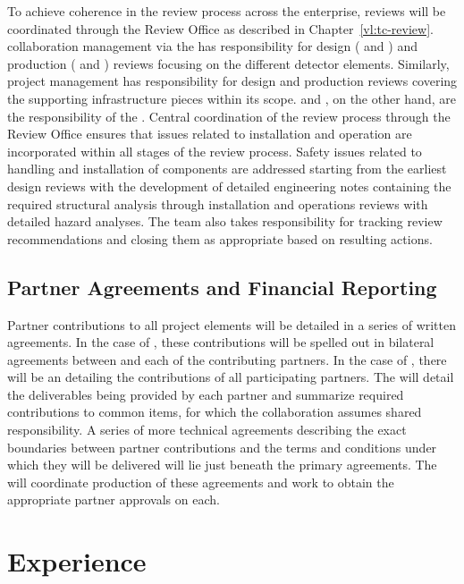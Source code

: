 To achieve coherence in the review process across the
 enterprise, reviews will be coordinated through the
 Review Office as described in Chapter~\ref{vl:tc-review}.
 collaboration management via the  has
responsibility for design ( and ) and production
( and ) reviews focusing on the different
detector elements.  Similarly,  project management has
responsibility for design and production reviews covering the
supporting infrastructure pieces within its scope.   and
, on the other hand, are the responsibility of the
.  Central coordination of the review process through the
 Review Office ensures that issues related to installation
and operation are incorporated within all stages of the review
process.  Safety issues related to handling and installation of
components are addressed starting from the earliest design reviews
with the development of detailed engineering notes containing the
required structural analysis through installation and operations
reviews with detailed hazard analyses.  The  team also
takes responsibility for tracking review recommendations and closing
them as appropriate based on resulting actions.

\subsection{Partner Agreements and Financial Reporting}
\label{sec:dune_agreements}

Partner contributions to all project elements will be detailed 
in a series of written agreements.  In the case of , 
these contributions will be spelled out in bilateral agreements 
between  and each of the contributing partners.  In 
the case of , there will be an  
detailing the contributions of all participating partners.  The 
 will detail the deliverables being provided by each 
partner and summarize required contributions to common items, 
for which the collaboration assumes shared responsibility.  
A series of more technical agreements describing the exact 
boundaries between partner contributions and the terms and 
conditions under which they will be delivered will lie just 
beneath the primary agreements.  The  will coordinate 
production of these agreements and work to obtain the appropriate 
partner approvals on each.  

\section{ Experience}
\label{sec:dune_protodune}

